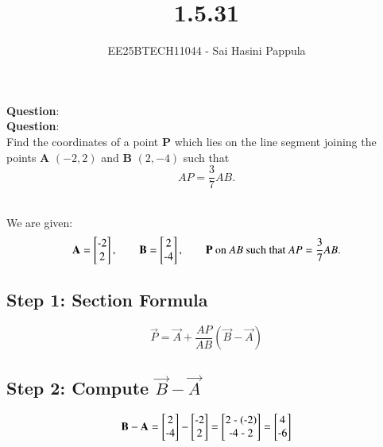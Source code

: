 \documentclass[journal]{IEEEtran}
\begin{document}

\vspace{3cm}

\title{1.5.31}
\author{EE25BTECH11044 - Sai Hasini Pappula}
 \maketitle
{\let\newpage\relax\maketitle}

\renewcommand{\thefigure}{\theenumi}
\renewcommand{\thetable}{\theenumi}
\setlength{\intextsep}{10pt} %


\renewcommand{\thetable}{\theenumi}

\textbf{Question}:\\
\textbf{Question}:\\
Find the coordinates of a point \textbf{P} which lies on the line segment joining the points 
\textbf{A} $(-2,2)$ and \textbf{B} $(2,-4)$ such that 
\[
AP = \frac{3}{7} AB.
\]

\solution\\
We are given:
\[
\vec{A} = \begin{bmatrix}$-2$ \\ $2$\end{bmatrix}, \qquad
\vec{B} = \begin{bmatrix}$2$ \\ $-4$\end{bmatrix}, \qquad
\vec{P} \text{ on } AB \text{ such that } AP = \frac{3}{7} AB.
\]

\subsection*{Step 1: Section Formula}
\[
\vec{P} = \vec{A} + \frac{AP}{AB}(\vec{B}-\vec{A})
\]

\subsection*{Step 2: Compute $\vec{B}-\vec{A}$}
\[
\vec{B}-\vec{A} =
\begin{bmatrix}$2$ \\ $-4$\end{bmatrix} -
\begin{bmatrix}$-2$ \\ $2$\end{bmatrix} =
\begin{bmatrix}
$2 - (-2)$ \\
$-4 - 2$
\end{bmatrix} =
\begin{bmatrix}
$4$ \\
$-6$
\end{bmatrix}
\]
\end{document}

